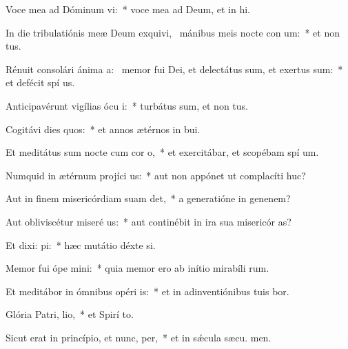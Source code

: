 \item Voce mea ad Dóminum vi:~* voce mea ad Deum, et in hi.
\item In die tribulatiónis meæ Deum exquivi,~\pscross{} mánibus meis nocte con um:~* et non  tus.
\item Rénuit consolári ánima a:~\pscross{} memor fui Dei, et delectátus sum, et exertus sum:~* et defécit spí us.
\item Anticipavérunt vigílias ócu i:~* turbátus sum, et non  tus.
\item Cogitávi dies quos:~* et annos ætérnos in  bui.
\item Et meditátus sum nocte cum cor o,~* et exercitábar, et scopébam spí um.
\item Numquid in ætérnum projíci us:~* aut non appónet ut complacíti  huc?
\item Aut in finem misericórdiam suam det,~* a generatióne in genenem?
\item Aut obliviscétur miseré us:~* aut continébit in ira sua misericór as?
\item Et dixi:  pi:~* hæc mutátio déxte si.
\item Memor fui ópe mini:~* quia memor ero ab inítio mirabíli rum.
\item Et meditábor in ómnibus opéri is:~* et in adinventiónibus tuis bor.
\item Glória Patri,  lio,~* et Spirí to.
\item Sicut erat in princípio, et nunc,  per,~* et in sǽcula sæcu. men.
